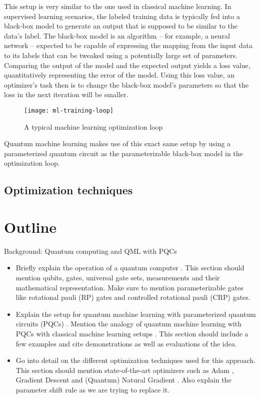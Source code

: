 This setup is very similar to the one used in classical machine learning.
In supervised learning scenarios, the labeled training data is typically fed
into a black-box model to generate an output that is supposed to be similar to
the data's label.
The black-box model is an algorithm -- for example, a neural network -- expected
to be capable of expressing the mapping from the input data to its labels that
can be tweaked using a potentially large set of parameters.
Comparing the output of the model and the expected output yields a loss value,
quantitatively representing the error of the model.
Using this loss value, an optimizer's task then is to change the black-box
model's parameters so that the loss in the next iteration will be smaller.

\begin{figure}[h]
    \label{fig:ml-training-loop}
    \centering
    \texttt{[image: ml-training-loop]}
    \caption{A typical machine learning optimization loop}
\end{figure}

Quantum machine learning makes use of this exact same setup by using a
parameterized quantum circuit as the parameterizable black-box model in the
optimization loop.

\subsection{Optimization techniques}

\section{Outline}
Background: Quantum computing and QML with PQCs
\begin{itemize}
    \item
        Briefly explain the operation of a quantum computer
        \cite{nielsen_quantum_2007}.
        This section should mention qubits, gates, universal gate sets,
        measurements and their mathematical representation.
        Make sure to mention parameterizable gates like rotational pauli (RP)
        gates and controlled rotational pauli (CRP) gates.
    \item
        Explain the setup for quantum machine learning with parameterized
        quantum circuits (PQCs) \cite{mitarai_quantum_2018}.
        Mention the analogy of quantum machine learning with PQCs with
        classical machine learning setups \cite{bishop_pattern_2006}.
        This section should include a few examples and cite demonstrations
        as well as evaluations of the idea.
    \item
        Go into detail on the different optimization techniques used for
        this approach.
        This section should mention state-of-the-art optimizers such as
        Adam \cite{kingma_adam_2017}, Gradient Descent and
        (Quantum) Natural Gradient \cite{stokes_quantum_2020}.
        Also explain the parameter shift rule
        \cite{mitarai_quantum_2018,schuld_evaluating_2019} as we are trying
        to replace it.
\end{itemize}
